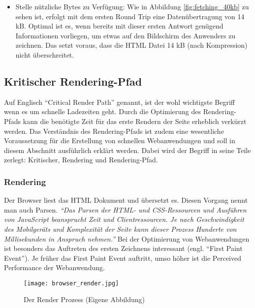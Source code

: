 \begin{itemize}
			\item Stelle nützliche Bytes zu Verfügung: Wie in Abbildung \ref{fig:fetching_40kb} zu sehen ist, erfolgt mit dem ersten Round Trip eine Datenübertragung von  14 kB. Optimal ist es, wenn bereits mit dieser ersten Antwort genügend Informationen vorliegen, um etwas auf den Bildschirm des Anwenders zu zeichnen. Das setzt voraus, dass die HTML Datei 14 kB (nach Kompression) nicht überschreitet.

		\end{itemize}

	\pagebreak

	\subsection{Kritischer Rendering-Pfad} %
	\label{sub:critical_render_path}
		Auf Englisch "`Critical Render Path"' genannt, ist der wohl wichtigste Begriff wenn es um schnelle Ladezeiten geht. Durch die Optimierung des Rendering-Pfads kann die benötigte Zeit für das erste Rendern der Seite erheblich verkürzt werden. Das Verständnis des Rendering-Pfads ist zudem eine wesentliche Voraussetzung für die Erstellung von schnellen Webanwendungen und soll in diesem Abschnitt ausführlich erklärt werden. Dabei wird der Begriff in seine Teile zerlegt: Kritischer, Rendering und Rendering-Pfad.

		\subsubsection{Rendering} %
		\label{ssub:rendering}
			Der Browser liest das HTML Dokument und übersetzt es. Diesen Vorgang nennt man auch Parsen. \textit{"`Das Parsen der HTML- und CSS-Ressourcen und Ausführen von JavaScript beansprucht Zeit und Clientressourcen. Je nach Geschwindigkeit des Mobilgeräts und Komplexität der Seite kann dieser Prozess Hunderte von Millisekunden in Anspruch nehmen."'}\autocite{google14} Bei der Optimierung von Webanwendungen ist besonders das Auftreten des ersten Zeichnens interessant (engl. "`First Paint Event"'). Je früher das First Paint Event auftritt, umso höher ist die Perceived Performance der Webanwendung.

			\begin{figure}[htbp]
				\begin{center}
					\texttt{[image: browser\_render.jpg]}
					\caption{Der Render Prozess (Eigene Abbildung)}
					\label{fig:browser_render}
				\end{center}
			\end{figure}

